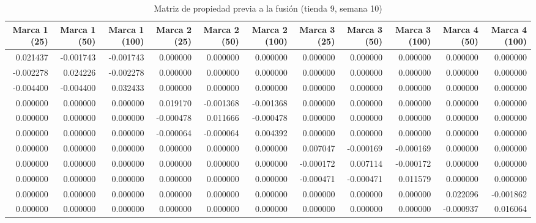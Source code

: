 \begin{table}
\centering
\caption{Matriz de propiedad previa a la fusión (tienda 9, semana 10)}
\begin{tabular}{rrrrrrrrrrr}
\toprule
 Marca 1 (25) &  Marca 1 (50) &  Marca 1 (100) &  Marca 2 (25) &  Marca 2 (50) &  Marca 2 (100) &  Marca 3 (25) &  Marca 3 (50) &  Marca 3 (100) &  Marca 4 (50) &  Marca 4 (100) \\
\midrule
     0.021437 &     -0.001743 &      -0.001743 &      0.000000 &      0.000000 &       0.000000 &      0.000000 &      0.000000 &       0.000000 &      0.000000 &       0.000000 \\
    -0.002278 &      0.024226 &      -0.002278 &      0.000000 &      0.000000 &       0.000000 &      0.000000 &      0.000000 &       0.000000 &      0.000000 &       0.000000 \\
    -0.004400 &     -0.004400 &       0.032433 &      0.000000 &      0.000000 &       0.000000 &      0.000000 &      0.000000 &       0.000000 &      0.000000 &       0.000000 \\
     0.000000 &      0.000000 &       0.000000 &      0.019170 &     -0.001368 &      -0.001368 &      0.000000 &      0.000000 &       0.000000 &      0.000000 &       0.000000 \\
     0.000000 &      0.000000 &       0.000000 &     -0.000478 &      0.011666 &      -0.000478 &      0.000000 &      0.000000 &       0.000000 &      0.000000 &       0.000000 \\
     0.000000 &      0.000000 &       0.000000 &     -0.000064 &     -0.000064 &       0.004392 &      0.000000 &      0.000000 &       0.000000 &      0.000000 &       0.000000 \\
     0.000000 &      0.000000 &       0.000000 &      0.000000 &      0.000000 &       0.000000 &      0.007047 &     -0.000169 &      -0.000169 &      0.000000 &       0.000000 \\
     0.000000 &      0.000000 &       0.000000 &      0.000000 &      0.000000 &       0.000000 &     -0.000172 &      0.007114 &      -0.000172 &      0.000000 &       0.000000 \\
     0.000000 &      0.000000 &       0.000000 &      0.000000 &      0.000000 &       0.000000 &     -0.000471 &     -0.000471 &       0.011579 &      0.000000 &       0.000000 \\
     0.000000 &      0.000000 &       0.000000 &      0.000000 &      0.000000 &       0.000000 &      0.000000 &      0.000000 &       0.000000 &      0.022096 &      -0.001862 \\
     0.000000 &      0.000000 &       0.000000 &      0.000000 &      0.000000 &       0.000000 &      0.000000 &      0.000000 &       0.000000 &     -0.000937 &       0.016064 \\
\bottomrule
\end{tabular}
\end{table}
